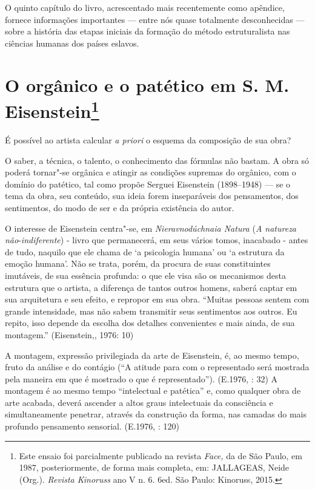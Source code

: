 O quinto capítulo do livro, acrescentado mais recentemente como
apêndice, fornece informações importantes --- entre nós quase totalmente
desconhecidas --- sobre a história das etapas iniciais da formação do
método estruturalista nas ciências humanas dos países eslavos.

\chapter{O orgânico e o patético em S. M. Eisenstein\footnote{Este ensaio
  foi parcialmente publicado na revista \emph{Face,} da  de São Paulo,
  em 1987, posteriormente, de forma mais completa, em:
  JALLAGEAS, Neide (Org.). \emph{Revista Kinoruss} ano V n. 6. 6ed. São
  Paulo: Kinoruss, 2015.}}

É possível ao artista calcular \emph{a priori} o esquema da composição
de sua obra?

O saber, a técnica, o talento, o conhecimento das fórmulas não bastam. A
obra só poderá tornar"-se orgânica e atingir as condições supremas do
orgânico, com o domínio do patético, tal como propõe Serguei Eisenstein
(1898--1948) --- se o tema da obra, seu conteúdo, sua ideia forem
inseparáveis dos pensamentos, dos sentimentos, do modo de ser e da
própria existência do autor.

O interesse de Eisenstein centra"-se, em \emph{Nieravnodúchnaia Natura}
(\emph{A natureza não}-\emph{indiferente}) - livro que permanecerá, em
seus vários tomos, inacabado - antes de tudo, naquilo que ele chama de
`a psicologia humana' ou `a estrutura da emoção humana'. Não se trata,
porém, da procura de suas constituintes imutáveis, de sua essência
profunda: o que ele visa são os mecanismos desta estrutura que o
artista, a diferença de tantos outros homens, saberá captar em sua
arquitetura e seu efeito, e repropor em sua obra. ``Muitas pessoas sentem com grande intensidade, mas não sabem transmitir
seus sentimentos aos outros. Eu repito, isso depende da escolha dos
detalhes convenientes e mais ainda, de sua montagem.'' (Eisenstein,,
1976: 10)

A montagem, expressão privilegiada da arte de Eisenstein, é, ao mesmo
tempo, fruto da análise e do contágio (``A atitude para com o
representado será mostrada pela maneira em que é mostrado o que é
representado''). (E.1976, : 32) A montagem é ao mesmo tempo ``intelectual
e patética'' e, como qualquer obra de arte acabada, deverá ascender a
altos graus intelectuais da consciência e simultaneamente penetrar,
através da construção da forma, nas camadas do mais profundo pensamento
sensorial. (E.1976, : 120)

